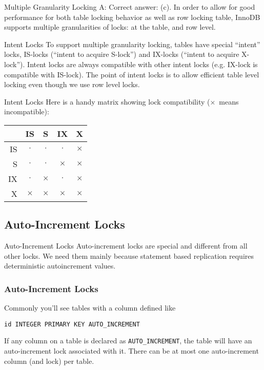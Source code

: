 \documentclass[14pt]{beamer}
\begin{document}
\begin{frame}{Multiple Granularity Locking}
  A: Correct answer: (c). In order to allow for good performance for both table
  locking behavior as well as row locking table, InnoDB supports multiple
  granularities of locks: at the table, and row level.
\end{frame}

\begin{frame}{Intent Locks}
  To support multiple granularity locking, tables have special ``intent'' locks,
  IS-locks (``intent to acquire S-lock'') and IX-locks (``intent to acquire
  X-lock'').
  \newline
  \newline
  Intent locks are always compatible with other intent locks (e.g. IX-lock is
  compatible with IS-lock). The point of intent locks is to allow efficient
  table level locking even though we use row level locks.
\end{frame}

\begin{frame}{Intent Locks}
  Here is a handy matrix showing lock compatibility ($\times$~means
  incompatible):
  \begin{table}[ht]
    \begin{tabular}{r|c c c c}
        & IS       & S        & IX       & X        \\ \hline
     IS & $\cdot$  & $\cdot$  & $\cdot$  & $\times$ \\
     S  & $\cdot$  & $\cdot$  & $\times$ & $\times$ \\
     IX & $\cdot$  & $\times$ & $\cdot$  & $\times$ \\
     X  & $\times$ & $\times$ & $\times$ & $\times$ \\
    \end{tabular}
  \end{table}
\end{frame}

\subsection{Auto-Increment Locks}

\begin{frame}{Auto-Increment Locks}
  Auto-increment locks are special and different from all other locks. We need
  them mainly because statement based replication requires deterministic
  autoincrement values.
\end{frame}

\begin{frame}[fragile]
  \frametitle{Auto-Increment Locks}
  Commonly you'll see tables with a column defined like
\begin{verbatim}
id INTEGER PRIMARY KEY AUTO_INCREMENT
\end{verbatim}
  If any column on a table is declared as \texttt{AUTO\_INCREMENT}, the table
  will have an auto-increment lock associated with it. There can be at most one
  auto-increment column (and lock) per table.
\end{frame}
\end{document}
